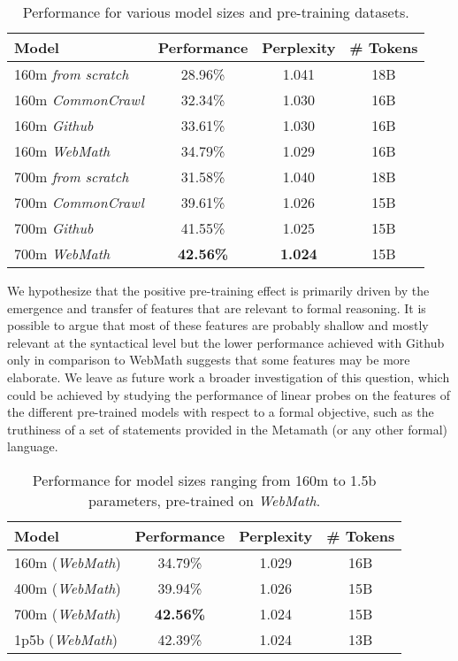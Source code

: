 \documentclass{article}
\begin{document}
\begin{table}[ht]
\caption{Performance for various model sizes and pre-training datasets.} 
\centering
\begin{tabular}{ |l|c|c|c| }
    \hline
    Model & Performance & Perplexity & \# Tokens \\
    \hline
    160m \textit{from scratch} & 28.96\% & 1.041 & 18B \\
    160m \textit{CommonCrawl} & 32.34\% &  1.030 & 16B \\
    160m \textit{Github} & 33.61\% & 1.030 & 16B \\
    160m \textit{WebMath} & 34.79\% & 1.029 & 16B \\
    700m \textit{from scratch} & 31.58\% & 1.040 & 18B \\
    700m \textit{CommonCrawl} & 39.61\% & 1.026 & 15B \\
    700m \textit{Github} & 41.55\% & 1.025 & 15B \\
    700m \textit{WebMath} & \textbf{42.56\%} & \textbf{1.024} & 15B \\
    \hline
\end{tabular}
\label{table:pretrain}
\end{table}

We hypothesize that the positive pre-training effect is primarily driven by the emergence and transfer of features that are relevant to formal reasoning. It is possible to argue that most of these features are probably shallow and mostly relevant at the syntactical level but the lower performance achieved with Github only in comparison to WebMath suggests that some features may be more elaborate. We leave as future work a broader investigation of this question, which could be achieved by studying the performance of linear probes on the
features of the different pre-trained models with respect to a formal objective, such as the truthiness of a set of statements provided in the Metamath (or any other formal) language.

\begin{table}[ht]
\caption{Performance for model sizes ranging from 160m to 1.5b parameters, pre-trained on \textit{WebMath}.} 
\centering
\begin{tabular}{ |l|c|c|c| }
    \hline
    Model & Performance & Perplexity & \# Tokens \\
    \hline
    160m (\textit{WebMath}) & 34.79\% & 1.029 & 16B \\
    400m (\textit{WebMath}) & 39.94\% & 1.026 & 15B \\
    700m (\textit{WebMath}) & \textbf{42.56\%} & 1.024 & 15B \\
    1p5b (\textit{WebMath}) & 42.39\% & 1.024 & 13B \\
    \hline
\end{tabular}
\label{table:webmath}
\end{table}
\end{document}
